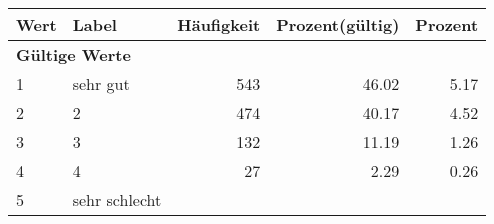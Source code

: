      \begin{longtable}{lXrrr}
     \toprule
     \textbf{Wert} & \textbf{Label} & \textbf{Häufigkeit} & \textbf{Prozent(gültig)} & \textbf{Prozent} \\
     \endhead
     \midrule
     \multicolumn{5}{l}{\textbf{Gültige Werte}}\\

     1 &
     \multicolumn{1}{X}{ sehr gut   } &


       \num{543} &
       \num[round-mode=places,round-precision=2]{46,02} &
         \num[round-mode=places,round-precision=2]{5,17} \\

     2 &
     \multicolumn{1}{X}{ 2   } &


       \num{474} &
       \num[round-mode=places,round-precision=2]{40,17} &
         \num[round-mode=places,round-precision=2]{4,52} \\

     3 &
     \multicolumn{1}{X}{ 3   } &


       \num{132} &
       \num[round-mode=places,round-precision=2]{11,19} &
         \num[round-mode=places,round-precision=2]{1,26} \\

     4 &
     \multicolumn{1}{X}{ 4   } &


       \num{27} &
       \num[round-mode=places,round-precision=2]{2,29} &
         \num[round-mode=places,round-precision=2]{0,26} \\

     5 &
     \multicolumn{1}{X}{ sehr schlecht   } &



\end{longtable}
